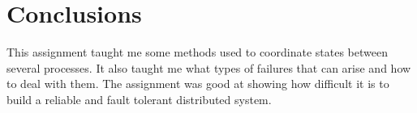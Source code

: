 \documentclass[a4paper, 11pt]{article}
\begin{document}
\section{Conclusions}

This assignment taught me some methods used to coordinate states between several processes. It also taught me what types of failures that can arise and how to deal with them. The assignment was good at showing how difficult it is to build a reliable and fault tolerant distributed system.
\end{document}
